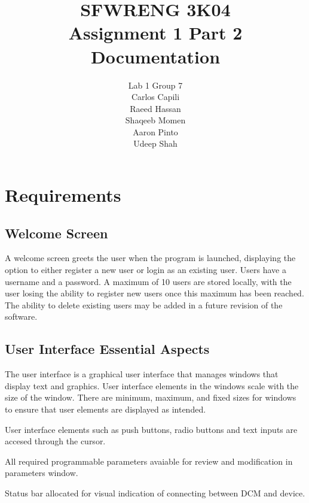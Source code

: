 \documentclass[12pt]{article}
\title{SFWRENG 3K04 \\ Assignment 1 Part 2 \\ Documentation}
\author{
    Lab 1 Group 7 \\
    Carlos Capili \\
    Raeed Hassan \\
    Shaqeeb Momen \\
    Aaron Pinto \\
    Udeep Shah
}
\date{}
\begin{document}
\maketitle \newpage
\tableofcontents \newpage

\section{Requirements}
\subsection{Welcome Screen}
A welcome screen greets the user when the program is launched, displaying the option to either register a new user or login as an existing user. Users have a username and a password. A maximum of 10 users are stored locally, with the user losing the ability to register new users once this maximum has been reached. The ability to delete existing users may be added in a future revision of the software.

\subsection{User Interface Essential Aspects}
The user interface is a graphical user interface that manages windows that display text and graphics. User interface elements in the windows scale with the size of the window. There are minimum, maximum, and fixed sizes for windows to ensure that user elements are displayed as intended.

User interface elements such as push buttons, radio buttons and text inputs are accesed through the cursor.

All required programmable parameters avaiable for review and modification in parameters window.

Status bar allocated for visual indication of connecting between DCM and device.
\end{document}
